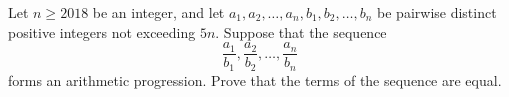 Let $n\geq 2018$ be an integer, and let $a_1,a_2,\ldots,a_n,b_1,b_2,\ldots,b_n$ be pairwise distinct positive integers not exceeding $5n$. Suppose that the sequence
\[
\frac{a_1}{b_1},\frac{a_2}{b_2},\ldots,\frac{a_n}{b_n}
\]
forms an arithmetic progression. Prove that the terms of the sequence are equal.
